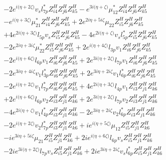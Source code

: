 \begin{align}
 &-2 e^{i \Big(\eta +2 \zeta \Big)} v_s l_{7p}^* Z_{{i 4}}^{H} Z_{{j 6}}^{H} Z_{{k 5}}^{H} - e^{3 i \Big(\eta +\zeta \Big)} \mu_{12}^* Z_{{i 4}}^{H} Z_{{j 6}}^{H} Z_{{k 5}}^{H} \nonumber \\ 
 &- e^{i \Big(\eta +3 \zeta \Big)} \mu_{21}^* Z_{{i 4}}^{H} Z_{{j 6}}^{H} Z_{{k 5}}^{H} +2 e^{2 i \eta +5 i \zeta } \mu_{22} Z_{{i 5}}^{H} Z_{{j 6}}^{H} Z_{{k 5}}^{H} \nonumber \\ 
 &+4 e^{2 i \Big(\eta +3 \zeta \Big)} l_{5p} v_s Z_{{i 5}}^{H} Z_{{j 6}}^{H} Z_{{k 5}}^{H} -4 e^{2 i \Big(\eta +\zeta \Big)} v_s l_{5p}^* Z_{{i 5}}^{H} Z_{{j 6}}^{H} Z_{{k 5}}^{H} \nonumber \\ 
 &-2 e^{2 i \eta +3 i \zeta } \mu_{22}^* Z_{{i 5}}^{H} Z_{{j 6}}^{H} Z_{{k 5}}^{H} +2 e^{i \Big(\eta +4 \zeta \Big)} l_{3p} v_1 Z_{{i 6}}^{H} Z_{{j 6}}^{H} Z_{{k 5}}^{H} \nonumber \\ 
 &-2 e^{i \Big(\eta +6 \zeta \Big)} l_{6p} v_1 Z_{{i 6}}^{H} Z_{{j 6}}^{H} Z_{{k 5}}^{H} +2 e^{3 i \Big(\eta +2 \zeta \Big)} l_{7p} v_1 Z_{{i 6}}^{H} Z_{{j 6}}^{H} Z_{{k 5}}^{H} \nonumber \\ 
 &-2 e^{3 i \eta +4 i \zeta } v_1 l_{3p}^* Z_{{i 6}}^{H} Z_{{j 6}}^{H} Z_{{k 5}}^{H} +2 e^{3 i \eta +2 i \zeta } v_1 l_{6p}^* Z_{{i 6}}^{H} Z_{{j 6}}^{H} Z_{{k 5}}^{H} \nonumber \\ 
 &-2 e^{i \Big(\eta +2 \zeta \Big)} v_1 l_{7p}^* Z_{{i 6}}^{H} Z_{{j 6}}^{H} Z_{{k 5}}^{H} +4 e^{2 i \Big(\eta +3 \zeta \Big)} l_{4p} v_1 Z_{{i 3}}^{H} Z_{{j 1}}^{H} Z_{{k 6}}^{H} \nonumber \\ 
 &+2 e^{i \Big(\eta +6 \zeta \Big)} l_{6p} v_2 Z_{{i 3}}^{H} Z_{{j 1}}^{H} Z_{{k 6}}^{H} +2 e^{3 i \Big(\eta +2 \zeta \Big)} l_{7p} v_2 Z_{{i 3}}^{H} Z_{{j 1}}^{H} Z_{{k 6}}^{H} \nonumber \\ 
 &-4 e^{2 i \Big(\eta +\zeta \Big)} v_1 l_{4p}^* Z_{{i 3}}^{H} Z_{{j 1}}^{H} Z_{{k 6}}^{H} -2 e^{3 i \eta +2 i \zeta } v_2 l_{6p}^* Z_{{i 3}}^{H} Z_{{j 1}}^{H} Z_{{k 6}}^{H} \nonumber \\ 
 &-2 e^{i \Big(\eta +2 \zeta \Big)} v_2 l_{7p}^* Z_{{i 3}}^{H} Z_{{j 1}}^{H} Z_{{k 6}}^{H} +i e^{i \Big(\eta +5 \zeta \Big)} \mu_{12} Z_{{i 5}}^{H} Z_{{j 1}}^{H} Z_{{k 6}}^{H} \nonumber \\ 
 &-i e^{3 i \eta +5 i \zeta } \mu_{21} Z_{{i 5}}^{H} Z_{{j 1}}^{H} Z_{{k 6}}^{H} +2 i e^{i \Big(\eta +6 \zeta \Big)} l_{6p} v_s Z_{{i 5}}^{H} Z_{{j 1}}^{H} Z_{{k 6}}^{H} \nonumber \\ 
 &-2 i e^{3 i \Big(\eta +2 \zeta \Big)} l_{7p} v_s Z_{{i 5}}^{H} Z_{{j 1}}^{H} Z_{{k 6}}^{H} +2 i e^{3 i \eta +2 i \zeta } v_s l_{6p}^* Z_{{i 5}}^{H} Z_{{j 1}}^{H} Z_{{k 6}}^{H} \nonumber \\ 

\end{align}
